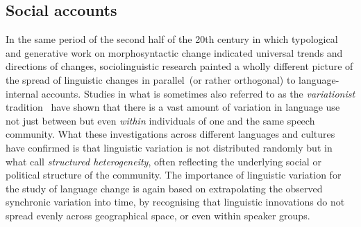 

\subsection{Social accounts}

In the same period of the second half of the 20th century in which typological and generative work on morphosyntactic change indicated universal trends and directions of changes, sociolinguistic research %
painted a wholly different picture of the spread of linguistic changes in parallel~(or rather orthogonal) to language-internal accounts.
Studies in what is sometimes also referred to as the \emph{variationist} tradition~\citep{Tagliamonte2015} have shown that there is a vast amount of variation in language use not just between but even \emph{within} individuals of one and the same speech community.
What these investigations across different languages and cultures have confirmed is that linguistic variation is not distributed randomly but in what \citet{Weinreich1968} call \emph{structured heterogeneity}, often reflecting the underlying social or political structure of the community.
The importance of linguistic variation for the study of language change is again based on extrapolating the observed synchronic variation into time, by recognising that linguistic innovations do not spread evenly across geographical space, or even within speaker groups.

